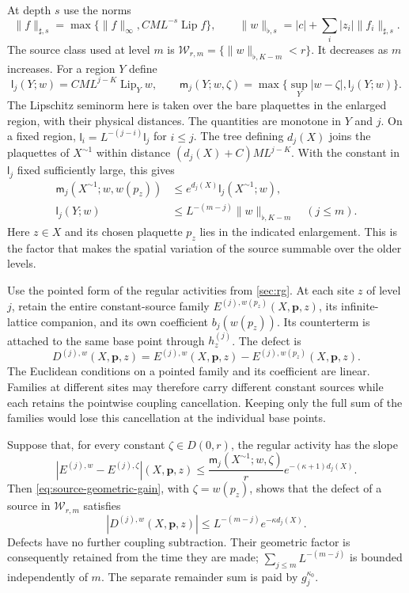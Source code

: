 \documentclass[11pt,letterpaper,reqno]{amsart}
\theoremstyle{definition}
\theoremstyle{remark}
\newcommand{\Lip}{\operatorname{Lip}}
\begin{document}
At depth $s$ use the norms
\[
 \|f\|_{\sharp,s}=\max\{\|f\|_\infty,CM L^{-s}\Lip f\},\qquad
 \|w\|_{\flat,s}=|c|+\sum_i|z_i|\|f_i\|_{\sharp,s}.
\]
The source class used at level $m$ is
$\mathcal W_{r,m}=\{\|w\|_{\flat,K-m}<r\}$.
It decreases as $m$ increases. For a region $Y$ define
\[
 \mathsf l_j(Y;w)=CM L^{j-K}\Lip_Y w,\qquad
 \mathsf m_j(Y;w,\zeta)=
 \max\{\sup_Y|w-\zeta|,\mathsf l_j(Y;w)\}.
\]
The Lipschitz seminorm here is taken over the bare plaquettes in the
enlarged region, with their physical distances. The quantities are
monotone in $Y$ and $j$. On a fixed region,
$\mathsf l_i=L^{-(j-i)}\mathsf l_j$ for $i\le j$.
The tree defining $d_j(X)$ joins the plaquettes of $X^{\sim1}$
within distance $(d_j(X)+C)ML^{j-K}$. With the constant in
$\mathsf l_j$ fixed sufficiently large, this gives
\begin{equation}\label{eq:source-geometric-gain}
 \begin{split}
 \mathsf m_j(X^{\sim1};w,w(p_z))
       &\le e^{d_j(X)}\mathsf l_j(X^{\sim1};w),\\
 \mathsf l_j(Y;w)&\le L^{-(m-j)}\|w\|_{\flat,K-m}
                        \quad(j\le m).
 \end{split}
\end{equation}
Here $z\in X$ and its chosen plaquette $p_z$ lies in the indicated
enlargement. This is the factor that makes the spatial variation of
the source summable over the older levels.

Use the pointed form of the regular activities from \cref{sec:rg}.
At each site $z$ of level $j$, retain the entire constant-source
family $E^{(j),w(p_z)}(X,\mathbf p,z)$, its infinite-lattice
companion, and its own coefficient $b_j(w(p_z))$. Its counterterm
is attached to the same base point through $h_z^{(j)}$. The defect
is
\begin{equation}\label{eq:source-pointed-defect}
 D^{(j),w}(X,\mathbf p,z)
 =E^{(j),w}(X,\mathbf p,z)
                  -E^{(j),w(p_z)}(X,\mathbf p,z).
\end{equation}
The Euclidean conditions on a pointed family and its coefficient
are linear. Families at different sites may therefore carry
different constant sources while each retains the pointwise
coupling cancellation. Keeping only the full sum of the families
would lose this cancellation at the individual base points.

Suppose that, for every constant $\zeta\in D(0,r)$, the regular
activity has the slope
\begin{equation}\label{eq:source-regular-slope}
 |E^{(j),w}-E^{(j),\zeta}|(X,\mathbf p,z)
 \le\frac{\mathsf m_j(X^{\sim1};w,\zeta)}r
                                  e^{-(\kappa+1)d_j(X)}.
\end{equation}
Then \eqref{eq:source-geometric-gain}, with $\zeta=w(p_z)$,
shows that the defect of a source in $\mathcal W_{r,m}$ satisfies
\[
 |D^{(j),w}(X,\mathbf p,z)|
                   \le L^{-(m-j)}e^{-\kappa d_j(X)}.
\]
Defects have no further coupling subtraction. Their geometric
factor is consequently retained from the time they are made;
$\sum_{j\le m}L^{-(m-j)}$ is bounded independently of $m$.
The separate remainder sum is paid by $g_j^{\kappa_0}$.
\end{document}
